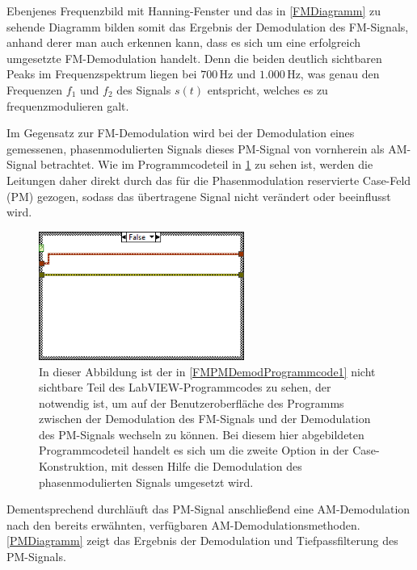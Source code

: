 \documentclass[
a4paper,
12pt,
pagesize,
ngerman
]{scrartcl}
\begin{document}
	\noindent Ebenjenes Frequenzbild mit Hanning-Fenster und das in \cref{FMDiagramm} zu sehende Diagramm bilden somit das Ergebnis der Demodulation des FM-Signals, anhand derer man auch erkennen kann, dass es sich um eine erfolgreich umgesetzte FM-Demodulation handelt.
	Denn die beiden deutlich sichtbaren Peaks im Frequenzspektrum liegen bei $700\,$Hz und $1.000\,$Hz, was genau den Frequenzen $f_1$ und $f_2$ des Signals $s(t)$ entspricht, welches es zu frequenzmodulieren galt.
	
	Im Gegensatz zur FM-Demodulation wird bei der Demodulation eines gemessenen, phasenmodulierten Signals dieses PM-Signal von vornherein als AM-Signal betrachtet.
	Wie im Programmcodeteil in \cref{FMPMDemodProgrammcode2} zu sehen ist, werden die Leitungen daher direkt durch das für die Phasenmodulation reservierte Case-Feld (\glqq PM\grqq ) gezogen, sodass das übertragene Signal nicht verändert oder beeinflusst wird.
	
	\begin{figure}[H]
		\centering
		\includegraphics[width=0.6\textwidth]{EIRE2018Dateien/Tag4/OsziFMPM-Demod/PM/OsziPlusFMPMd5}
		\caption{In dieser Abbildung ist der in \cref{FMPMDemodProgrammcode1} nicht sichtbare Teil des LabVIEW-Programmcodes zu sehen, der notwendig ist, um auf der Benutzeroberfläche des Programms zwischen der Demodulation des FM-Signals und der Demodulation des PM-Signals wechseln zu können. Bei diesem hier abgebildeten Programmcodeteil handelt es sich um die zweite Option in der Case-Konstruktion, mit dessen Hilfe die Demodulation des phasenmodulierten Signals umgesetzt wird.}
		\label{FMPMDemodProgrammcode2}
	\end{figure}
	
	\noindent Dementsprechend durchläuft das PM-Signal anschließend eine AM-Demodulation nach den bereits erwähnten, verfügbaren AM-Demodulationsmethoden.
	\cref{PMDiagramm} zeigt das Ergebnis der Demodulation und Tiefpassfilterung des PM-Signals.
	
\end{document}
